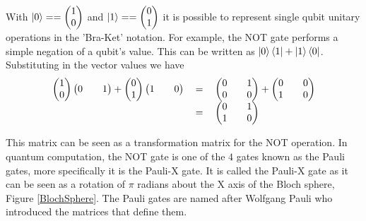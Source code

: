 With
$\left\vert{0}\right\rangle
== 
\begin {pmatrix}
1\\
0\\
\end{pmatrix}
$
and
$\left\vert{1}\right\rangle
==  
\begin {pmatrix}
0\\
1\\
\end{pmatrix}
$
it is possible to represent single qubit unitary operations in the 'Bra-Ket' notation.
For example, the NOT gate performs a simple negation of a qubit's value.
This can be written as $\left\vert{0}\right\rangle\left\langle{1}\right\vert + \left\vert{1}\right\rangle\left\langle{0}\right\vert$.
Substituting in the vector values we have
\begin{equation}
\begin{tabular}{ r c l }
\(\begin {pmatrix}
1\\
0
\end{pmatrix}
\begin {pmatrix}
0&&
1
\end{pmatrix}
 + 
\begin {pmatrix}
0\\
1
\end{pmatrix}
\begin {pmatrix}
1&&
0
\end{pmatrix}\)
& \(=\)
& \( 
\begin{pmatrix}
0 && 1 \\
0 && 0
\end{pmatrix}
 + 
\begin{pmatrix}
0 && 0\\
1 && 0
\end{pmatrix}
\) \\
& \(=\)
& \( 
\begin{pmatrix}
0 && 1 \\
1 && 0
\end{pmatrix}
\)
\end{tabular}
\label{eq:notexplanded}
\end{equation}

This matrix can be seen as a transformation matrix for the NOT operation.
In quantum computation, the NOT gate is one of the $4$ gates known as the Pauli gates, more specifically it is the Pauli-X gate.
It is called the Pauli-X gate as it can be seen as a rotation of $\pi$ radians about the X axis of the Bloch sphere, Figure \ref{BlochSphere}.
The Pauli gates are named after Wolfgang Pauli who introduced the matrices that define them.

